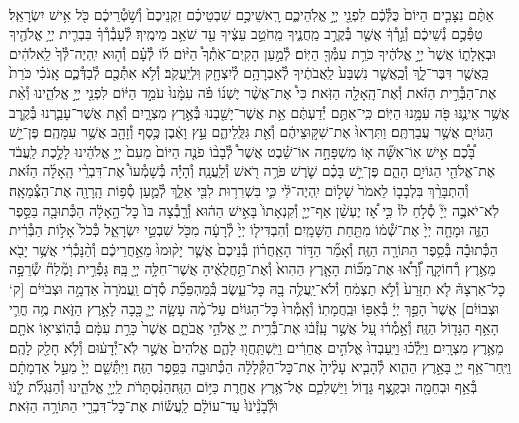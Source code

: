 \documentclass[twoside, openany, parskip=half, 11pt]{book}
\begin{document}
\begin{footnotesize}
\begin{multicols}{2}
\\
אַתֶּ֨ם נִצָּבִ֤ים הַיּוֹם֙ כֻּלְּ֯כֶ֔ם לִפְנֵ֖י יְיָ֣ אֱלֹֽהֵיכֶ֑ם רָֽאשֵׁיכֶ֣ם שִׁבְטֵיכֶ֗ם זִקְנֵיכֶם֙ וְ֯שֹׁ֣טְ֯רֵיכֶ֔ם כֹּ֖ל אִ֥ישׁ יִשְׂרָאֵֽל׃ טַפְּ֯כֶ֣ם נְ֯שֵׁיכֶ֔ם וְ֯גֵ֣רְ֯ךָ֔ אֲשֶׁ֖ר בְּ֯קֶרֶ֣ב מַֽחֲנֶ֑יךָ מֵֽחֹטֵ֣ב עֵצֶ֔יךָ עַ֖ד שֹׁאֵ֥ב מֵימֶֽיךָ׃ לְ֯עָבְ֯רְ֯ךָ֗ בִּבְרִ֛ית יְיָ֥ אֱלֹהֶ֖יךָ וּבְאָֽלָת֑וֹ אֲשֶׁר֙ יְיָ֣ אֱלֹהֶ֔יךָ כֹּרֵ֥ת עִמְּ֯ךָ֖ הַיּֽוֹם׃
לְ֯מַ֣עַן הָקִֽים־אֹֽתְ֯ךָ֩ הַיּ֨וֹם ל֜וֹ לְ֯עָ֗ם וְ֯ה֤וּא יִֽהְיֶה־לְּ֯ךָ֙ לֵֽאלֹהִ֔ים כַּֽאֲשֶׁ֖ר דִּבֶּר־לָ֑ךְ וְ֯כַֽאֲשֶׁ֤ר נִשְׁבַּע֙ לַֽאֲבֹתֶ֔יךָ לְ֯אַבְרָהָ֥ם לְ֯יִצְחָ֖ק וּֽלְיַֽעֲקֹֽב׃ וְ֯לֹ֥א אִתְּ֯כֶ֖ם לְ֯בַדְּ֯כֶ֑ם אָֽנֹכִ֗י כֹּרֵת֙ אֶת־הַבְּ֯רִ֣ית הַזֹּ֔את וְ֯אֶת־הָֽאָלָ֖ה הַזֹּֽאת׃ כִּי֩ אֶת־אֲשֶׁ֨ר יֶשְׁנ֜וֹ פֹּ֗ה עִמָּ֨נוּ֙ עֹמֵ֣ד הַיּ֔וֹם לִפְנֵ֖י יְיָ֣ אֱלֹהֵ֑ינוּ וְ֯אֵ֨ת אֲשֶׁ֥ר אֵינֶ֛נּוּ פֹּ֖ה עִמָּ֥נוּ הַיּֽוֹם׃
כִּֽי־אַתֶּ֣ם יְ֯דַעְתֶּ֔ם אֵ֥ת אֲשֶׁר־יָשַׁ֖בְנוּ בְּ֯אֶ֣רֶץ מִצְרָ֑יִם וְ֯אֵ֧ת אֲשֶׁר־עָבַ֛רְנוּ בְּ֯קֶ֥רֶב הַגּוֹיִ֖ם אֲשֶׁ֥ר עֲבַרְתֶּֽם׃ וַתִּרְאוּ֙ אֶת־שִׁקּ֣וּצֵיהֶ֔ם וְ֯אֵ֖ת גִּלֻּֽלֵיהֶ֑ם עֵ֣ץ וָאֶ֔בֶן כֶּ֥סֶף וְ֯זָהָ֖ב אֲשֶׁ֥ר עִמָּהֶֽם׃ פֶּן־יֵ֣שׁ בָּ֠כֶ֠ם אִ֣ישׁ אֽוֹ־אִשָּׁ֞ה א֧וֹ מִשְׁפָּחָ֣ה אוֹ־שֵׁ֗בֶט אֲשֶׁר֩ לְ֯בָב֨וֹ פֹנֶ֤ה הַיּוֹם֙ מֵעִם֙ יְיָ֣ אֱלֹהֵ֔ינוּ לָלֶ֣כֶת לַֽעֲבֹ֔ד אֶת־אֱלֹהֵ֖י הַגּוֹיִ֣ם הָהֵ֑ם פֶּן־יֵ֣שׁ בָּכֶ֗ם שֹׁ֛רֶשׁ פֹּרֶ֥ה רֹ֖אשׁ וְ֯לַֽעֲנָֽה׃ וְ֯הָיָ֡ה בְּ֯שָׁמְ֯עוֹ֩ אֶת־דִּבְרֵ֨י הָֽאָלָ֜ה הַזֹּ֗את וְ֯הִתְבָּרֵ֨ךְ בִּלְבָב֤וֹ לֵאמֹר֙ שָׁל֣וֹם יִֽהְיֶה־לִּ֔י כִּ֛י בִּשְׁרִר֥וּת לִבִּ֖י אֵלֵ֑ךְ לְ֯מַ֛עַן סְ֯פ֥וֹת הָֽרָוָ֖ה אֶת־הַצְּ֯מֵאָֽה׃ לֹֽא־יֹאבֶ֣ה יְיָ֘ סְ֯לֹ֣חַ לוֹ֒ כִּ֣י אָ֠ז יֶעְשַׁ֨ן אַף־יְיָ֤ וְ֯קִנְאָתוֹ֙ בָּאִ֣ישׁ הַה֔וּא וְ֯רָ֤בְ֯צָה בּוֹ֙ כׇּל־הָ֣אָלָ֔ה הַכְּ֯תוּבָ֖ה בַּסֵּ֣פֶר הַזֶּ֑ה וּמָחָ֤ה יְיָ֙ אֶת־שְׁ֯מ֔וֹ מִתַּ֖חַת הַשָּׁמָֽיִם׃ וְ֯הִבְדִּיל֤וֹ יְיָ֙ לְ֯רָעָ֔ה מִכֹּ֖ל שִׁבְטֵ֣י יִשְׂרָאֵ֑ל כְּ֯כֹל֙ אָל֣וֹת הַבְּ֯רִ֔ית הַכְּ֯תוּבָ֕ה בְּ֯סֵ֥פֶר הַתּוֹרָ֖ה הַזֶּֽה׃ וְ֯אָמַ֞ר הַדּ֣וֹר הָאַֽחֲר֗וֹן בְּ֯נֵיכֶם֙ אֲשֶׁ֤ר יָק֨וּמוּ֙ מֵאַ֣חֲרֵיכֶ֔ם וְ֯הַ֨נָּכְ֯רִ֔י אֲשֶׁ֥ר יָבֹ֖א מֵאֶ֣רֶץ רְ֯חוֹקָ֑ה וְ֠֯רָא֠וּ אֶת־מַכּ֞וֹת הָאָ֤רֶץ הַהִוא֙ וְ֯אֶת־תַּ֣חֲלֻאֶ֔יהָ אֲשֶׁר־חִלָּ֥ה יְיָ֖ בָּֽהּ׃ גָּפְ֯רִ֣ית וָמֶ֘לַח֘ שְׂ֯רֵפָ֣ה כׇל־אַרְצָהּ֒ לֹ֤א תִזָּרַע֙ וְ֯לֹ֣א תַצְמִ֔חַ וְ֯לֹא־יַֽעֲלֶ֥ה בָ֖הּ כׇּל־עֵ֑שֶׂב כְּֽ֯מַהְפֵּכַ֞ת סְ֯דֹ֤ם וַֽעֲמֹרָה֙ אַדְמָ֣ה וּצְבֹיִי֔ם [ק‘ וּצְבוֹיִ֔ם] אֲשֶׁר֙ הָפַ֣ךְ יְיָ֔ בְּ֯אַפּ֖וֹ וּבַֽחֲמָתֽוֹ׃ וְ֯אָֽמְ֯רוּ֙ כׇּל־הַגּוֹיִ֔ם עַל־מֶ֨ה עָשָׂ֧ה יְיָ֛ כָּ֖כָה לָאָ֣רֶץ הַזֹּ֑את מֶ֥ה חֳרִ֛י הָאַ֥ף הַגָּד֖וֹל הַזֶּֽה׃ וְ֯אָ֣מְ֯ר֔וּ עַ֚ל אֲשֶׁ֣ר עָֽזְ֯ב֔וּ אֶת־בְּ֯רִ֥ית יְיָ֖ אֱלֹהֵ֣י אֲבֹתָ֑ם אֲשֶׁר֙ כָּרַ֣ת עִמָּ֔ם בְּ֯הֽוֹצִיא֥וֹ אֹתָ֖ם מֵאֶ֥רֶץ מִצְרָֽיִם׃ וַיֵּֽלְ֯כ֗וּ וַיַּֽעַבְדוּ֙ אֱלֹהִ֣ים אֲחֵרִ֔ים וַיִּֽשְׁתַּֽחֲו֖וּ לָהֶ֑ם אֱלֹהִים֙ אֲשֶׁ֣ר לֹֽא־יְ֯דָע֔וּם וְ֯לֹ֥א חָלַ֖ק לָהֶֽם׃ וַיִּֽחַר־אַ֥ף יְיָ֖ בָּאָ֣רֶץ הַהִ֑וא לְ֯הָבִ֤יא עָלֶ֨יהָ֙ אֶת־כׇּל־הַקְּ֯לָלָ֔ה הַכְּ֯תוּבָ֖ה בַּסֵּ֥פֶר הַזֶּֽה׃ וַיִּתְּ֯שֵׁ֤ם יְיָ֙ מֵעַ֣ל אַדְמָתָ֔ם בְּ֯אַ֥ף וּבְחֵמָ֖ה וּבְקֶ֣צֶף גָּד֑וֹל וַיַּשְׁלִכֵ֛ם אֶל־אֶ֥רֶץ אֲחֶ֖רֶת כַּיּ֥וֹם הַזֶּֽה׃הַנִּ֨סְתָּרֹ֔ת לַֽיְיָ֖ אֱלֹהֵ֑ינוּ וְ֯הַנִּגְלֹ֞ת לָֹ֤נֹוֹּ וֹּלְֹ֯בָֹנֵֹ֨יֹנֹוֹּ֙ עַד־עוֹלָ֔ם לַֽעֲשׂ֕וֹת אֶת־כׇּל־דִּבְרֵ֖י הַתּוֹרָ֥ה הַזֹּֽאת׃


\end{multicols}
\end{footnotesize}
\end{document}
